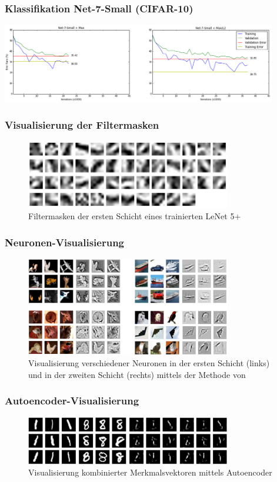 \documentclass{beamer}
\begin{document}
\begin{frame}
\frametitle{Klassifikation Net-7-Small (CIFAR-10)}
\includegraphics[width=0.9\textwidth]{images/experiments/6_overfit_small_2}
\end{frame}

 
\begin{frame}
\frametitle{Visualisierung der Filtermasken}
\begin{figure}
\centering
\includegraphics[width=0.8\textwidth]{images/experiments/6_mnist_trained_filters.png}
\caption{Filtermasken der ersten Schicht eines trainierten LeNet 5+}
\end{figure}
\end{frame}

\begin{frame}
\frametitle{Neuronen-Visualisierung}
\begin{figure}
\centering
\includegraphics[width=0.8\textwidth]{images/experiments/6_visualize_cifar.png}
\caption{Visualisierung verschiedener Neuronen in der ersten Schicht (links) und in der zweiten Schicht (rechts) mittels der Methode von \cite{Zeiler2014}}
\end{figure}
\end{frame}


\begin{frame}
\frametitle{Autoencoder-Visualisierung}
\begin{figure}
\centering
\includegraphics[width=0.8\textwidth]{images/experiments/6_visualize_mnist_autoenc_8_1}
\caption{Visualisierung kombinierter Merkmalsvektoren mittels Autoencoder}
\end{figure}
\end{frame}
\end{document}
